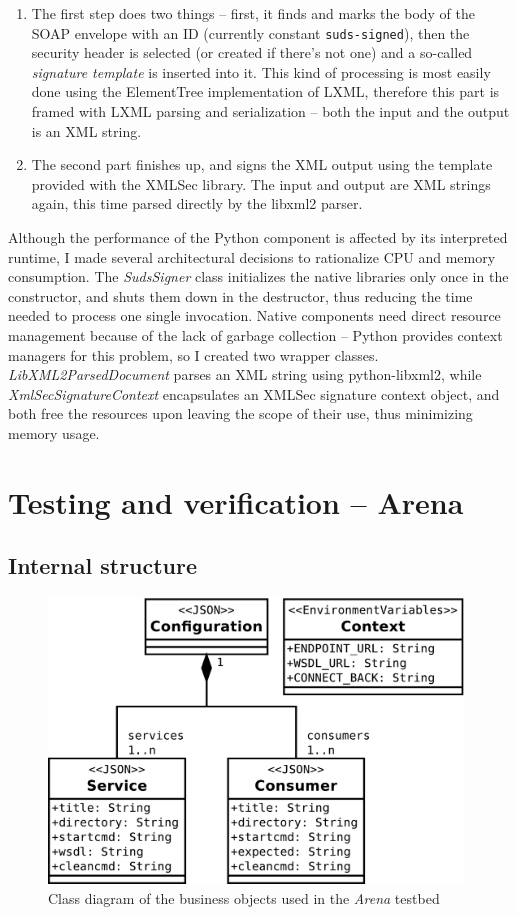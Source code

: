 \begin{enumerate}
 \item The first step does two things -- first, it finds and marks the body of the SOAP envelope with an ID (currently constant \verb|suds-signed|), then the security header is selected (or created if there's not one) and a so-called \emph{signature template} is inserted into it. This kind of processing is most easily done using the ElementTree implementation of LXML, therefore this part is framed with LXML parsing and serialization -- both the input and the output is an XML string.
 \item The second part finishes up, and signs the XML output using the template provided with the XMLSec library. The input and output are XML strings again, this time parsed directly by the libxml2 parser.
\end{enumerate}

Although the performance of the Python component is affected by its interpreted runtime, I made several architectural decisions to rationalize CPU and memory consumption. The \emph{SudsSigner} class initializes the native libraries only once in the constructor, and shuts them down in the destructor, thus reducing the time needed to process one single invocation. Native components need direct resource management because of the lack of garbage collection -- Python provides context managers for this problem, so I created two wrapper classes. \emph{LibXML2ParsedDocument} parses an XML string using python-libxml2, while \emph{XmlSecSignatureContext} encapsulates an XMLSec signature context object, and both free the resources upon leaving the scope of their use, thus minimizing memory usage.

\section{Testing and verification -- Arena}

\subsection{Internal structure}

\begin{figure}[htbp]
 \centering
 \includegraphics[width=11cm]{images/clsdArena.pdf}
 \caption{Class diagram of the business objects used in the \emph{Arena} testbed}
 \label{fig:clsdArena}
\end{figure}

